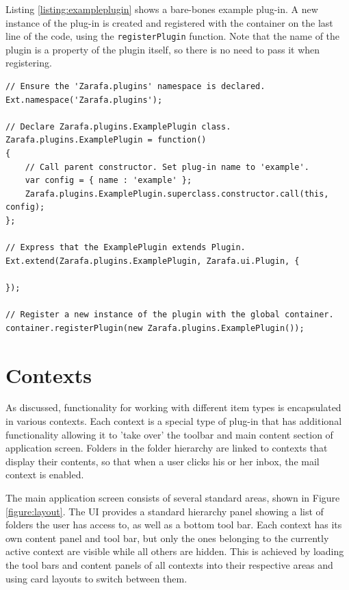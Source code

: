 Listing \ref{listing:exampleplugin} shows a bare-bones example plug-in. A new instance of the plug-in is created and
registered with the container on the last line of the code, using the {\tt registerPlugin} function. 
Note that the name of the plugin is a property of the
plugin itself, so there is no need to pass it when registering.

\begin{lstlisting}[caption={Example plugin.}, label=listing:exampleplugin]
// Ensure the 'Zarafa.plugins' namespace is declared.
Ext.namespace('Zarafa.plugins');

// Declare Zarafa.plugins.ExamplePlugin class.
Zarafa.plugins.ExamplePlugin = function()
{
	// Call parent constructor. Set plug-in name to 'example'.
	var config = { name : 'example' };
	Zarafa.plugins.ExamplePlugin.superclass.constructor.call(this, config);
};

// Express that the ExamplePlugin extends Plugin.
Ext.extend(Zarafa.plugins.ExamplePlugin, Zarafa.ui.Plugin, {
	
});

// Register a new instance of the plugin with the global container.
container.registerPlugin(new Zarafa.plugins.ExamplePlugin());\end{lstlisting}

\section{Contexts}
\label{section:contexts}

As discussed, functionality for working with different item types is encapsulated
in various contexts. Each context is a special type of plug-in that has additional functionality allowing it to 
'take over' the toolbar and main content section of application screen. Folders in the folder hierarchy are 
linked to contexts that display their contents, so that when a user clicks his or her inbox, the mail context
is enabled. 

The main application screen consists of several standard areas, shown in Figure \ref{figure:layout}.
The UI provides a standard hierarchy panel showing a list of folders the user has access to, as well as a 
bottom tool bar. Each context has its own content panel and tool bar, but only the ones belonging to the 
currently active context are visible while all others are hidden. This is achieved by loading the tool bars 
and content panels of all contexts into their respective areas and using card layouts to switch between them.


